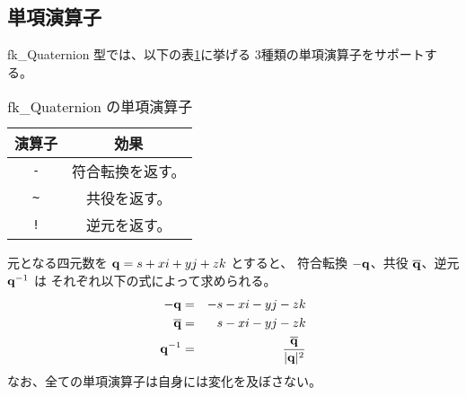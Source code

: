 \subsection{単項演算子}
fk\_Quaternion 型では、以下の表\ref{tbl:fkQ1}に挙げる
3種類の単項演算子をサポートする。
\begin{table}[H]
\caption{fk\_Quaternion の単項演算子}
\label{tbl:fkQ1}
\begin{center}
\begin{tabular}{|c|c|}
\hline
演算子 & 効果 \\ \hline \hline
\verb+-+ & 符合転換を返す。 \\ \hline
\verb+~+ & 共役を返す。\\ \hline
\verb+!+ & 逆元を返す。\\ \hline
\end{tabular}
\end{center}
\end{table}
元となる四元数を \(\mathbf{q} = s + xi + yj + zk\) とすると、
符合転換 \(-\mathbf{q}\)、共役 \(\overline{\mathbf{q}}\)、逆元 \(\mathbf{q}^{-1}\) は
それぞれ以下の式によって求められる。
\begin{eqnarray*}
	-\mathbf{q} &=& -s - xi - yj - zk \\
	\overline{\mathbf{q}} &=& s - xi - yj - zk \\
	\mathbf{q}^{-1} &=& {\displaystyle \frac{\overline{\mathbf{q}}}{|\mathbf{q}|^2}}
\end{eqnarray*}
なお、全ての単項演算子は自身には変化を及ぼさない。
